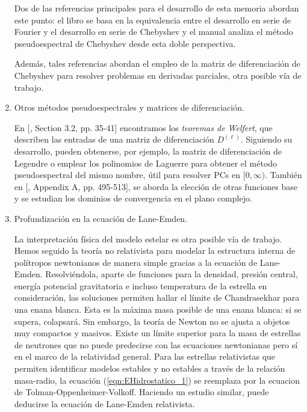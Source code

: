 \documentclass[main.tex]{subfiles}
\begin{document}
\begin{enumerate}[label=\textbullet]
  Dos de las referencias principales para el desarrollo de esta
  memoria abordan este punto: 
 el libro \cite{boyd2001chebyshev} se basa en la equivalencia entre
  el desarrollo en serie de Fourier y el desarrollo en serie de Chebyshev y el manual \cite{trefethen2000spectral}  analiza el método pseudoespectral de Chebyshev desde esta doble perspectiva.
		
  Además, tales referencias abordan el empleo de la matriz de
  diferenciación de Chebyshev para resolver problemas en derivadas
  parciales, otra posible vía de trabajo.
		
		
		
		
		
		
  \item Otros métodos pseudoespectrales y matrices de diferenciación.
		
  En [\cite{alici2003pseudospectral}, Section 3.2, pp. 35-41]
  encontramos los {\itshape teoremas de Welfert}, que describen las
  entradas de una matriz de diferenciación $D^{(\ell)}$. 
  Siguiendo su desarrollo, pueden obtenerse, por ejemplo, la matriz de
  diferenciación de Legendre o emplear los polinomios de Laguerre para
  obtener el método pseudoespectral del mismo nombre, útil para
  resolver PCs en $[0, \infty)$. 
  También en [\cite{boyd2001chebyshev}, Appendix A, pp. 495-513], se
  aborda la elección de otras funciones base y se estudian los dominios de convergencia en el plano complejo.
						
				
			
  \item Profundización en la ecuación de Lane-Emden. 
		
  La interpretación física del modelo estelar es otra posible vía de
  trabajo. 
  Hemos seguido la teoría no relativista para modelar la estructura
  interna de polítropos newtonianos de manera simple gracias a la
  ecuación de Lane-Emden. 
  Resolviéndola, aparte de funciones para la densidad, presión 
  central,
  energía potencial gravitatoria e incluso temperatura de la 
  estrella en consideración, las
  soluciones permiten hallar el límite de 
  Chandrasekhar
  para una enana blanca. 
  Esta es la máxima masa posible de una enana blanca: si se supera,
  colapsará. Sin embargo, la teoría de Newton no se ajusta a objetos muy compactos y masivos. 
  Existe un límite superior para la masa de estrellas de neutrones que no puede predecirse con las ecuaciones newtonianas pero sí en el marco de la relatividad general. 
  Para las estrellas relativistas que permiten identificar modelos estables y no estables a través de la relación masa-radio, la ecuación (\ref{eqn:EHidrostatico_1}) se reemplaza por la ecuacion de Tolman-Oppenheimer-Volkoff. Haciendo un estudio similar, puede deducirse la ecuación de Lane-Emden relativista.

		
		
		
		
\end{enumerate}
\biblio
\end{document}
